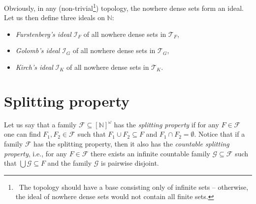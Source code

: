 \documentclass{amsart}
\theoremstyle{definition}
\newcommand{\N}{{\mathbb N}}
\newcommand{\I}{\mathcal I}
\newcommand{\T}{\mathcal{T}}
\newcommand{\InfSubs}{[\N]^{\omega}}
\begin{document}
Obviously, in any (non-trivial\footnote{\ The topology should have a base consisting only of 
infinite sets -- otherwise, the ideal of nowhere dense sets would not contain all finite sets.}) topology, the nowhere dense sets form an ideal. Let us then define three ideals on $\N$:
\begin{itemize}
\item \emph{Furstenberg's ideal} $\I_F$ of all nowhere dense sets in $\T_F$,
\item \emph{Golomb's ideal} $\I_G$ of all nowhere dense sets in $\T_G$,
\item \emph{Kirch's ideal} $\I_K$ of all nowhere dense sets in $\T_K$.
\end{itemize}


\section*{Splitting property}

Let us say that a family $\mathcal{F} \subseteq \InfSubs$ has the \emph{splitting property} if for any $F \in \mathcal{F}$ one can find $F_1, F_2 \in \mathcal{F}$ such that $F_1 \cup F_2 \subseteq F$ and $F_1 \cap F_2 = \emptyset$. Notice that if a family $\mathcal{F}$ has the splitting property, then it also has the \emph{countable splitting property}, i.e., for any $F \in \mathcal{F}$ there exists an infinite countable family $\mathcal{G} \subseteq \mathcal{F}$ such that $\bigcup{\mathcal{G}} \subseteq F$ and the family $\mathcal{G}$ is pairwise disjoint.
\end{document}
